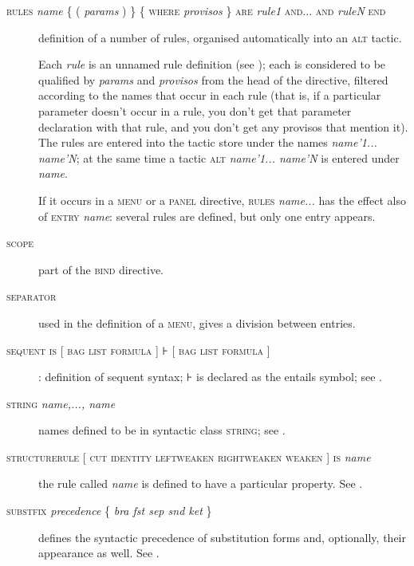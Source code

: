\begin{description}
\item[\textsc{rules} \textit{name} \{ ( \textit{params} ) \} \{ \textsc{where} \textit{provisos} \} \textsc{are} \textit{rule1} \textsc{and... and} \textit{ruleN} \textsc{end}] definition of a number of rules, organised automatically into an \textsc{alt} tactic.

Each \textit{rule} is an unnamed rule definition (see ); each is considered to be qualified by \textit{params} and \textit{provisos} from the head of the directive, filtered according to the names that occur in each rule (that is, if a particular parameter doesn't occur in a rule, you don't get that parameter declaration with that rule, and you don't get any provisos that mention it). The rules are entered into the tactic store under the names \textit{name'1... name'N}; at the same time a tactic \textsc{alt} \textit{name'1... name'N} is entered under \textit{name}.

If it occurs in a \textsc{menu} or a \textsc{panel} directive, \textsc{rules} \textit{name...} has the effect also of \textsc{entry} \textit{name}: several rules are defined, but only one entry appears.

\item[\textsc{scope}] part of the \textsc{bind} directive.

\item[\textsc{separator}] used in the definition of a \textsc{menu}, gives a division between entries. %

\item[\textsc{sequent is} {[} \textsc{bag} {\textbar} \textsc{list} {\textbar} \textsc{formula} {]} ⊦ {[} \textsc{bag} {\textbar} \textsc{list} {\textbar} \textsc{formula} {]}]: definition of sequent syntax; ⊦ is declared as the entails symbol; see .

\item[\textsc{string} \textit{name,..., name}] names defined to be in syntactic class \textsc{string}; see .

\item[\textsc{structurerule} {[} \textsc{cut} {\textbar} \textsc{identity} {\textbar} \textsc{leftweaken} {\textbar} \textsc{rightweaken} {\textbar} \textsc{weaken} {]} \textsc{is} \textit{name}] the rule called \textit{name} is defined to have a particular property. See .

\item[\textsc{substfix} \textit{precedence} \{ \textit{bra fst sep snd ket} \}] defines the syntactic precedence of substitution forms and, optionally, their appearance as well. See .


\end{description}

